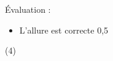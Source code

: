 %
%
    Évaluation :
    \begin{itemize}
        \item L'allure est correcte \hfill 0,5
    \end{itemize}
    \begin{tasks}(4)
        \task {}
        \task {}
        \task {}
        \task {}
    \end{tasks}
